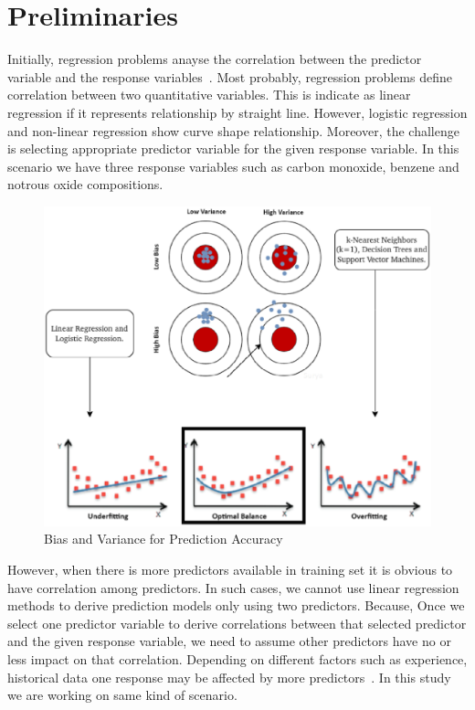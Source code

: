 


\section{Preliminaries} \label{sec-preliminaries}

Initially, regression problems 
anayse the correlation between 
the predictor variable and the response variables~\citep{uyanik2013study}.
Most probably, regression problems define correlation 
between two quantitative variables.
This is indicate as linear regression if it represents 
relationship by straight line. 
However, logistic regression and non-linear regression show curve shape relationship. 
Moreover, the challenge is 
selecting appropriate predictor 
variable for the given response variable. 
In this scenario we have three 
response variables such as 
carbon monoxide, benzene and notrous oxide compositions.

\begin{figure}
  \centering
 \includegraphics[width=0.8\linewidth,height=0.7\linewidth]{graphics//Bias_and_VrarianceAll.eps}
  \caption{Bias and Variance for Prediction Accuracy} \label{Bias_and_VrarianceAl}
\end{figure}

However, when there is more predictors available in training set it is obvious to have correlation among predictors. 
In such cases, we cannot use linear regression methods to 
derive prediction models only using two predictors.
Because, Once we select one predictor variable to derive 
correlations between that 
selected predictor and the given response variable, we need to 
assume other predictors have no or less impact on that correlation.
Depending on different factors such as experience, historical 
data one response may be affected by more predictors~\cite{seber2012linear}. 
In this study we are working on same kind of scenario.

